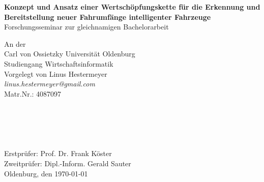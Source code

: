 \documentclass{article}
\begin{document}
\begin{titlepage}
    \begin{figure}[H]
    	\centering
    \end{figure}
 
    \begin{center}
        \large{\textbf{Konzept und Ansatz einer Wertschöpfungskette für die Erkennung und Bereitstellung neuer Fahrumfänge intelligenter Fahrzeuge}}\\
        \large Forschungsseminar zur gleichnamigen Bachelorarbeit
    \end{center}
    \vfill
    \large{
        An der\\
        Carl von Ossietzky Universität Oldenburg\\
        Studiengang Wirtschaftsinformatik\\
        
	    \noindent
	    Vorgelegt von Linus Hestermeyer\\ 
        \textit{linus.hestermeyer@gmail.com}\\
        Matr.Nr.: 4087097
        \\\\\\\\\\\\
        Erstprüfer: Prof. Dr. Frank Köster\\
        Zweitprüfer: Dipl.-Inform. Gerald Sauter\\
        \vfill
        \noindent
        Oldenburg, den \today
    }
\end{titlepage}
\thispagestyle{empty}
\tableofcontents
\clearpage
{}







\listoffigures



\end{document}
